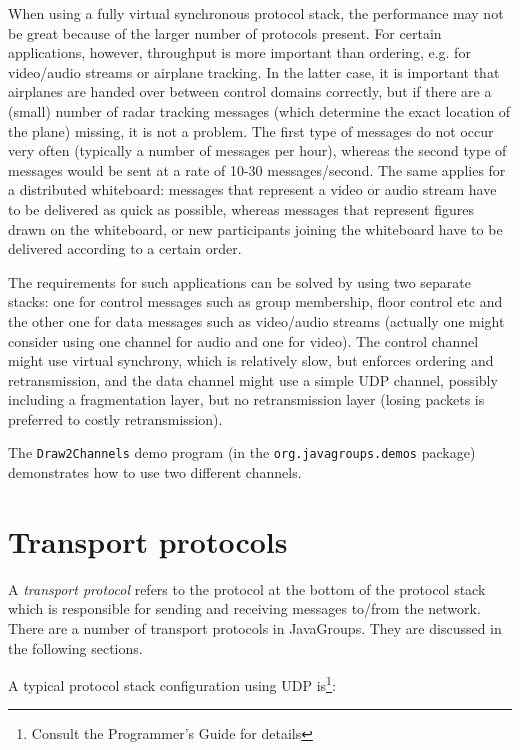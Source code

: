   When using a fully virtual synchronous protocol stack, the performance may not be
  great because of the larger number of protocols present. For certain applications,
  however, throughput is more important than ordering, e.g. for video/audio streams
  or airplane tracking. In the latter case, it is important that airplanes are handed
  over between control domains correctly, but if there are a (small) number of radar
  tracking messages (which determine the exact location of the plane) missing, it is
  not a problem. The first type of messages do not occur very often (typically a
  number of messages per hour), whereas the second type of messages would be sent at
  a rate of 10-30 messages/second. The same applies for a distributed whiteboard:
  messages that represent a video or audio stream have to be delivered as quick as
  possible, whereas messages that represent figures drawn on the whiteboard, or new
  participants joining the whiteboard have to be delivered according to a certain
  order.

  The requirements for such applications can be solved by using two separate stacks:
  one for control messages such as group membership, floor control etc and the other
  one for data messages such as video/audio streams (actually one might consider
  using one channel for audio and one for video). The control channel might use
  virtual synchrony, which is relatively slow, but enforces ordering and
  retransmission, and the data channel might use a simple UDP channel, possibly
  including a fragmentation layer, but no retransmission layer (losing packets is
  preferred to costly retransmission).

  The {\tt Draw2Channels} demo program (in the {\tt org.javagroups.demos} package)
  demonstrates how to use two different channels.






  \section{Transport protocols}

  A {\em transport protocol} refers to the protocol at the bottom of the protocol
  stack which is responsible for sending and receiving messages to/from the
  network. There are a number of transport protocols in JavaGroups. They are
  discussed in the following sections.

  A typical protocol stack configuration using UDP is\footnote{Consult the
  Programmer's Guide for details}:

